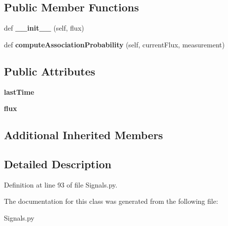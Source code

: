 \subsection*{Public Member Functions}
\begin{DoxyCompactItemize}
\item 
def {\bfseries \+\_\+\+\_\+init\+\_\+\+\_\+} (self, flux)\hypertarget{classSignals_1_1PoissonSource_a18f7e4d0f7f8385d195736a37fc0a445}{}\label{classSignals_1_1PoissonSource_a18f7e4d0f7f8385d195736a37fc0a445}

\item 
def {\bfseries compute\+Association\+Probability} (self, current\+Flux, measurement)\hypertarget{classSignals_1_1PoissonSource_a8e7a6023e7ee53ed0b5b81c7d0aa361c}{}\label{classSignals_1_1PoissonSource_a8e7a6023e7ee53ed0b5b81c7d0aa361c}

\end{DoxyCompactItemize}
\subsection*{Public Attributes}
\begin{DoxyCompactItemize}
\item 
{\bfseries last\+Time}\hypertarget{classSignals_1_1PoissonSource_a66b0f3fb48cc130b6b07d7427092a522}{}\label{classSignals_1_1PoissonSource_a66b0f3fb48cc130b6b07d7427092a522}

\item 
{\bfseries flux}\hypertarget{classSignals_1_1PoissonSource_a26e7bf25b1d9195bfded2a3ad6790bce}{}\label{classSignals_1_1PoissonSource_a26e7bf25b1d9195bfded2a3ad6790bce}

\end{DoxyCompactItemize}
\subsection*{Additional Inherited Members}


\subsection{Detailed Description}


Definition at line 93 of file Signals.\+py.



The documentation for this class was generated from the following file\+:\begin{DoxyCompactItemize}
\item 
Signals.\+py\end{DoxyCompactItemize}

